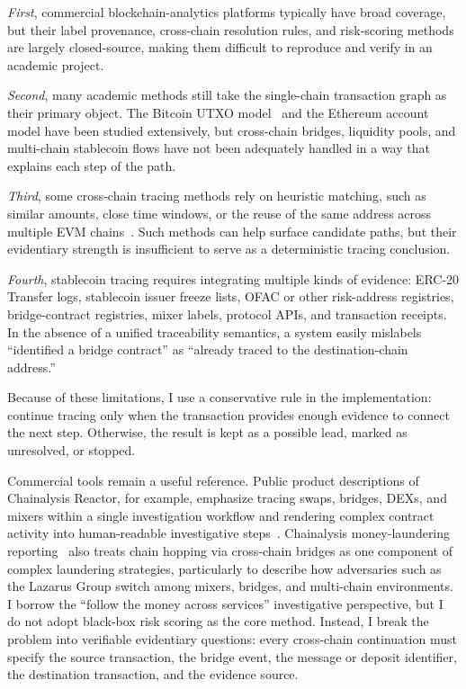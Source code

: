 \documentclass[12pt,a4paper]{article}
\begin{document}
\textit{First}, commercial blockchain-analytics platforms typically have broad coverage, but their label provenance, cross-chain resolution rules, and risk-scoring methods are largely closed-source, making them difficult to reproduce and verify in an academic project.

\textit{Second}, many academic methods still take the single-chain transaction graph as their primary object. The Bitcoin UTXO model~\cite{weber2019} and the Ethereum account model have been studied extensively, but cross-chain bridges, liquidity pools, and multi-chain stablecoin flows have not been adequately handled in a way that explains each step of the path.

\textit{Third}, some cross-chain tracing methods rely on heuristic matching, such as similar amounts, close time windows, or the reuse of the same address across multiple EVM chains~\cite{mazorra2023}. Such methods can help surface candidate paths, but their evidentiary strength is insufficient to serve as a deterministic tracing conclusion.

\textit{Fourth}, stablecoin tracing requires integrating multiple kinds of evidence: ERC-20 Transfer logs, stablecoin issuer freeze lists, OFAC or other risk-address registries, bridge-contract registries, mixer labels, protocol APIs, and transaction receipts. In the absence of a unified traceability semantics, a system easily mislabels ``identified a bridge contract'' as ``already traced to the destination-chain address.''

Because of these limitations, I use a conservative rule in the implementation: continue tracing only when the transaction provides enough evidence to connect the next step. Otherwise, the result is kept as a possible lead, marked as unresolved, or stopped.

Commercial tools remain a useful reference. Public product descriptions of Chainalysis Reactor, for example, emphasize tracing swaps, bridges, DEXs, and mixers within a single investigation workflow and rendering complex contract activity into human-readable investigative steps~\cite{chainalysisReactor2026}. Chainalysis money-laundering reporting~\cite{chainalysis2024} also treats chain hopping via cross-chain bridges as one component of complex laundering strategies, particularly to describe how adversaries such as the Lazarus Group switch among mixers, bridges, and multi-chain environments. I borrow the ``follow the money across services'' investigative perspective, but I do not adopt black-box risk scoring as the core method. Instead, I break the problem into verifiable evidentiary questions: every cross-chain continuation must specify the source transaction, the bridge event, the message or deposit identifier, the destination transaction, and the evidence source.
\end{document}
